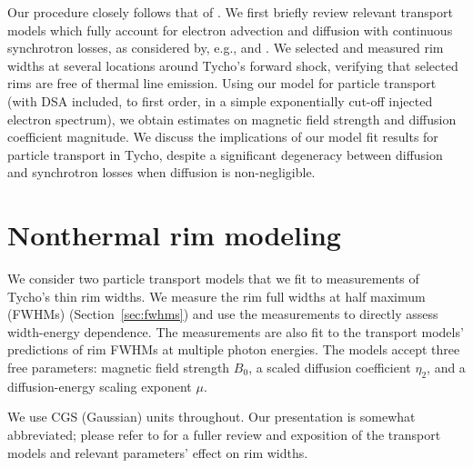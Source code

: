 \documentclass[iop, apj, numberedappendix]{emulateapj}
\newcommand*{\mt}{\mathrm}
\newcommand*{\tsynch}{\tau_{\mt{synch}}}
\begin{document}
Our procedure closely follows that of .
We first briefly review relevant transport models which fully account for
electron advection and diffusion with continuous synchrotron losses, as
considered by, e.g., \citet[and references therein]{berezhko2004} and
\citet{rettig2012}.  We selected and measured rim widths at several locations
around Tycho's forward shock, verifying that selected rims are free of thermal
line emission.  Using our model for particle transport (with DSA included, to
first order, in a simple exponentially cut-off injected electron spectrum), we
obtain estimates on magnetic field strength and diffusion coefficient
magnitude. We discuss the implications of our model fit results for
particle transport in Tycho, despite a significant degeneracy between
diffusion and synchrotron losses when diffusion is non-negligible.

\section{Nonthermal rim modeling}\label{sec:models}

We consider two particle transport models that we fit to measurements of
Tycho's thin rim widths.  We measure the rim full widths at half maximum
(FWHMs) (Section~\ref{sec:fwhms}) and use the measurements to directly assess
width-energy dependence.  The measurements are also fit to the transport
models' predictions of rim FWHMs at multiple photon energies.  The models
accept three free parameters: magnetic field strength $B_0$, a scaled diffusion
coefficient $\eta_2$, and a diffusion-energy scaling exponent $\mu$.

We use CGS (Gaussian) units throughout.  Our presentation is somewhat
abbreviated; please refer to  for a fuller review and
exposition of the transport models and relevant parameters' effect on rim
widths.

\end{document}
